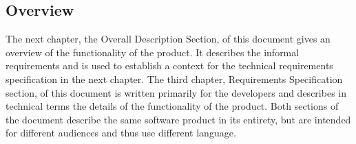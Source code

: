 \cite{xalan}
\cite{xerces}
\cite{icu}




\subsection{Overview}
The next chapter, the Overall Description Section, of this document gives an overview of the
functionality of the product. It describes the informal requirements and is used to establish a context for the technical requirements specification in the next chapter.
The third chapter, Requirements Specification section, of this document is written primarily for the developers and describes in technical terms the details of the functionality of the product.
Both sections of the document describe the same software product in its entirety, but are intended for different audiences and thus use different language.


